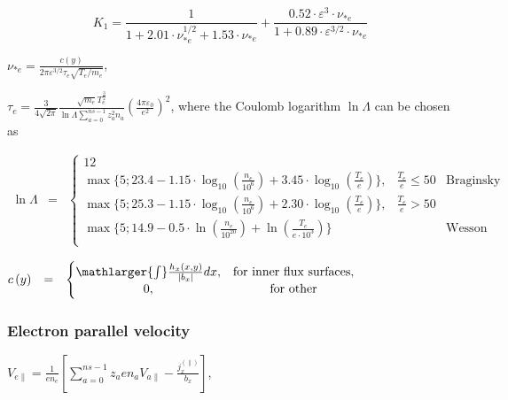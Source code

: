 \documentclass[a4paper,10pt]{report}
\begin{document}
\begin{equation*}
K_1 = \frac 1{1 + 2.01 \cdot \nu_{\ast e}^{1/2} + 1.53 \cdot \nu_{\ast e}} +
\frac{0.52 \cdot \varepsilon^3 \cdot \nu_{\ast e}}{1 + 0.89 \cdot \varepsilon^{3/2} \cdot \nu_{\ast e}}
\end{equation*}

$\nu_{\ast e} = \frac{c \left( y \right)}{2 \pi \varepsilon^{3/2} \tau_e \sqrt{T_e/m_e}}$,

$\tau_e = \frac 3{4\sqrt{2\pi}}
\frac{\sqrt{m_e} T_e^{\frac 3 2}} {\ln \Lambda \sum \limits_{a=0}^{ns-1} z_a^2 n_a}
\left( \frac{4 \pi \varepsilon_0}{e^2}\right)^2$,
where the Coulomb logarithm $\ln \Lambda $ can be chosen as

$
\begin{matrix}
\ln \Lambda & =
& \left\{
\begin{matrix}
12 \\
\max \{ 5; 23.4 - 1.15 \cdot \log_{10} \left( \frac{n_e}{10^6} \right) + 3.45 \cdot \log_{10} \left( \frac{T_e}e \right)  \}, & \frac{T_e}{e} \leq 50 & \text{Braginsky formula} \\
\max \{ 5; 25.3 - 1.15 \cdot \log_{10} \left( \frac{n_e}{10^6} \right) + 2.30 \cdot \log_{10} \left( \frac{T_e}e \right)  \}, & \frac{T_e}{e} > 50  \\
\max \{ 5; 14.9 - 0.5 \cdot \ln \left( \frac{n_e}{10^{20}} \right) + \ln \left( \frac{T_e}{e \cdot 10^3} \right)  \} && \text{Wesson formula for electron-electron collisions} \\
\end{matrix} \right.
\end{matrix}
$


$
\begin{matrix}
c \left( y \right) & =
& \left\{
\begin{matrix}
\mathlarger{\int} \frac{h_x \left( x,y \right)}{|b_x|}dx
, &  \text{for inner flux surfaces,} \\
0, &  \text{for other} \\
\end{matrix} \right.
\end{matrix}
$

\subsubsection{Electron parallel velocity}

$V_{e \parallel} = \frac 1{e n_e} \left[
\sum \limits_{a=0}^{ns -1} z_a e n_a V_{a\parallel} - \frac{j^{(\parallel)}_x}{b_x}
\right]$,
\end{document}
